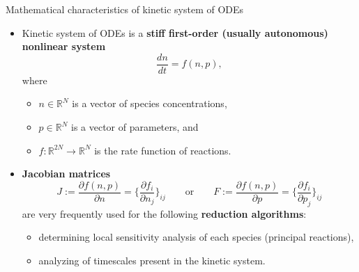 %
%
\begin{frame}{Mathematical characteristics of kinetic system of ODEs}
	\begin{itemize}
		\item Kinetic system of ODEs is a {\bf stiff first-order (usually autonomous) nonlinear system}
		\[	\frac{d n}{dt} = f(n, p), \]
		where
		\begin{itemize}
			\item $n \in \mathbb{R}^{N}$ is a vector of species concentrations,
			\item $p \in \mathbb{R}^{N}$ is a vector of parameters, and
			\item $f: \mathbb{R}^{2N} \rightarrow \mathbb{R}^{N}$ is the rate function of reactions.
		\end{itemize}
		\item {\bf Jacobian matrices}
		\[
		\boxed{
			J := \frac{\partial f(n, p)}{\partial n} = \bigg\{  \frac{\partial f_i}{\partial n_j} \bigg\}_{ij} \qquad  \mbox{or} \qquad
			F := \frac{\partial f(n, p)}{\partial p} = \bigg\{  \frac{\partial f_i}{\partial p_j} \bigg\}_{ij}
		}
		\]
		are very frequently used for the following {\bf reduction algorithms}:
		\begin{itemize}
			\item determining local sensitivity analysis of each species (principal reactions),
			\item analyzing of timescales present in the kinetic system.
		\end{itemize}
	\end{itemize}
\end{frame}
%
%

